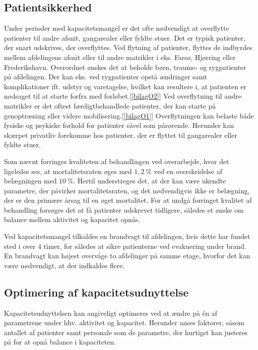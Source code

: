 \subsection{Patientsikkerhed}\label{patsik}
Under perioder med kapacitetsmangel er det ofte nødvendigt at overflytte patienter til andre afsnit, gangarealer eller fyldte stuer. Det er typisk patienter, der snart udskrives, der overflyttes. Ved flytning af patienter, flyttes de indbyrdes mellem afdelingens afsnit eller til andre matrikler i eks. Farsø, Hjørring eller Frederikshavn. Overordnet ønskes det at beholde børn, traume- og rygpatienter på afdelingen. Der kan eks. ved rygpatienter opstå ændringer samt komplikationer ift. udstyr og varetagelse, hvilket kan resultere i, at patienten er nødsaget til at starte forfra med forløbet.[\ref{bilagO2}] Ved overflytning til andre matrikler er det oftest færdigtbehandlede patienter, der kan starte på genoptræning eller videre mobilisering.[\ref{bilagO1}] Overflytningen kan belaste både fysiske og psykiske forhold for patienter såvel som pårørende\cite{Heidmann2014}. Herunder kan skærpet privatliv forekomme hos patienter, der er flyttet til gangarealer eller fyldte stuer\cite{Madsen2014}. 

Som nævnt forringes kvaliteten af behandlingen ved overarbejde, hvor det ligeledes ses, at mortalitetsraten øges med $1,2~\%$ ved en overskridelse af belægningen med $10~\%$\cite{Madsen2014}. Hertil understreges det, at der kan være ukendte parametre, der påvirker mortalitetsraten, og det nødvendigvis ikke er belægning, der er den primære årsag til en øget mortalitet. For at undgå forringet kvalitet af behandling forsøges det at få patienter udskrevet tidligere, således et ønske om balance mellem aktivitet og kapacitet opnås.


Ved kapacitetsmangel tilkaldes en brandvagt til afdelingen, hvis dette har fundet sted i over $4$ timer, for således at sikre patienterne ved evakuering under brand. En brandvagt kan højest overvåge to afdelinger på samme etage, hvorfor det kan være nødvendigt, at der indkaldes flere.\cite{Beredskab2016}


\subsection{Optimering af kapacitetsudnyttelse}
Kapacitetsudnyttelsen kan angiveligt optimeres ved at ændre på én af parametrene under hhv. aktivitet og kapacitet. Herunder anses faktorer, såsom antallet af patienter samt personale som de parametre, der hurtigst kan justeres på for at opnå balance i kapaciteten. 

